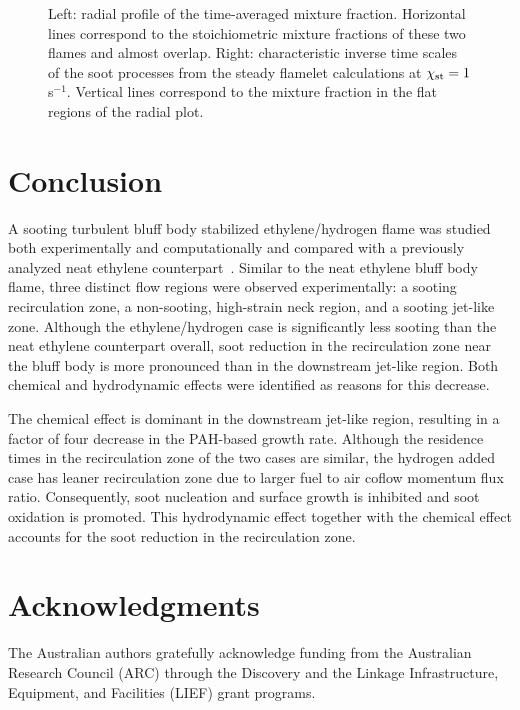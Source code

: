 \documentclass{essci}
\begin{document}
\begin{figure}[t]
  \centering
  \scriptsize
  \vspace{-0.10in}
  \resizebox{0.49\textwidth}{!}{}
  \resizebox{0.49\textwidth}{!}{}
  \vspace{-0.2in}
  \normalsize
  \caption{Left: radial profile of the time-averaged mixture fraction.  Horizontal lines correspond to the stoichiometric mixture fractions of these two flames and almost overlap.  Right: characteristic inverse time scales of the soot processes from the steady flamelet calculations at $\chi_{\rm st} = 1$ s$^{-1}$.  Vertical lines correspond to the mixture fraction in the flat regions of the radial plot.}
  \label{fig:timescale}
\end{figure}


\section{Conclusion}

A sooting turbulent bluff body stabilized ethylene/hydrogen flame was studied both experimentally and computationally and compared with a previously analyzed neat ethylene counterpart~\cite{mueller13}.  Similar to the neat ethylene bluff body flame, three distinct flow regions were observed experimentally: a sooting recirculation zone, a non-sooting, high-strain neck region, and a sooting jet-like zone.  Although the ethylene/hydrogen case is significantly less sooting than the neat ethylene counterpart overall, soot reduction in the recirculation zone near the bluff body is more pronounced than in the downstream jet-like region.  Both chemical and hydrodynamic effects were identified as reasons for this decrease.

The chemical effect is dominant in the downstream jet-like region, resulting in a factor of four decrease in the PAH-based growth rate.  Although the residence times in the recirculation zone of the two cases are similar, the hydrogen added case has leaner recirculation zone due to larger fuel to air coflow momentum flux ratio.  Consequently, soot nucleation and surface growth is inhibited and soot oxidation is promoted.  This hydrodynamic effect together with the chemical effect accounts for the soot reduction in the recirculation zone.

\section*{Acknowledgments}

The Australian authors gratefully acknowledge funding from the Australian Research Council (ARC) through the Discovery and the Linkage Infrastructure, Equipment, and Facilities (LIEF) grant programs.



\end{document}
